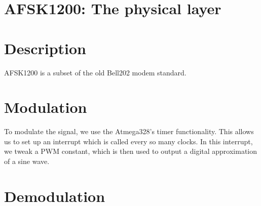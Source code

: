 

\section{AFSK1200: The physical layer}

\section{Description}

AFSK1200 is a subset of the old Bell202 modem standard\cite{ruafsk1200}.

\section{Modulation}

To modulate the signal, we use the Atmega328's timer functionality.
This allows us to set up an interrupt which is called every so many
clocks.  In this interrupt, we tweak a PWM constant, which is then
used to output a digital approximation of a sine wave.


\section{Demodulation}

